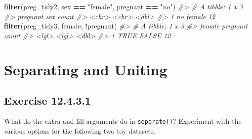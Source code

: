 \documentclass[]{book}
\newenvironment{Shaded}{\begin{snugshade}}{\end{snugshade}}
\newcommand{\CommentTok}[1]{\textcolor[rgb]{0.56,0.35,0.01}{\textit{#1}}}
\newcommand{\DataTypeTok}[1]{\textcolor[rgb]{0.13,0.29,0.53}{#1}}
\newcommand{\KeywordTok}[1]{\textcolor[rgb]{0.13,0.29,0.53}{\textbf{#1}}}
\newcommand{\NormalTok}[1]{#1}
\newcommand{\OperatorTok}[1]{\textcolor[rgb]{0.81,0.36,0.00}{\textbf{#1}}}
\newcommand{\StringTok}[1]{\textcolor[rgb]{0.31,0.60,0.02}{#1}}
\theoremstyle{plain}
\theoremstyle{remark}
\begin{document}
\begin{Shaded}
\begin{Highlighting}[]
\KeywordTok{filter}\NormalTok{(preg_tidy2, sex }\OperatorTok{==}\StringTok{ "female"}\NormalTok{, pregnant }\OperatorTok{==}\StringTok{ "no"}\NormalTok{)}
\CommentTok{#> # A tibble: 1 x 3}
\CommentTok{#>   pregnant sex    count}
\CommentTok{#>   <chr>    <chr>  <dbl>}
\CommentTok{#> 1 no       female    12}
\KeywordTok{filter}\NormalTok{(preg_tidy3, female, }\OperatorTok{!}\NormalTok{pregnant)}
\CommentTok{#> # A tibble: 1 x 3}
\CommentTok{#>   female pregnant count}
\CommentTok{#>   <lgl>  <lgl>    <dbl>}
\CommentTok{#> 1 TRUE   FALSE       12}
\end{Highlighting}
\end{Shaded}

\hypertarget{separating-and-uniting}{%
\section{Separating and Uniting}\label{separating-and-uniting}}

\hypertarget{exercise-12.4.3.1}{%
\subsection*{\texorpdfstring{Exercise {12.4.3.1}}{Exercise 12.4.3.1}}\label{exercise-12.4.3.1}}

What do the extra and fill arguments do in \texttt{separate()}? Experiment with the various options for the following two toy datasets.

\begin{Shaded}
\end{Shaded}
\end{document}
